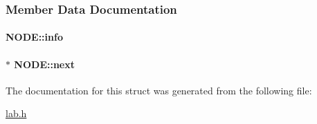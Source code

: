 \subsubsection{Member Data Documentation}
\hypertarget{structNODE_a8ae24fb8df6ea326ce23cab9331efdd6}{
\paragraph[{info}]{ N\+O\+D\+E\+::info}}\label{structNODE_a8ae24fb8df6ea326ce23cab9331efdd6}
\hypertarget{structNODE_a078472e8ab2d2fe38e052f5c2a425618}{
\paragraph[{next}]{$\ast$ N\+O\+D\+E\+::next}}\label{structNODE_a078472e8ab2d2fe38e052f5c2a425618}


The documentation for this struct was generated from the following file\+:\begin{DoxyCompactItemize}
\item 
\hyperlink{lab_8h}{lab.\+h}\end{DoxyCompactItemize}
